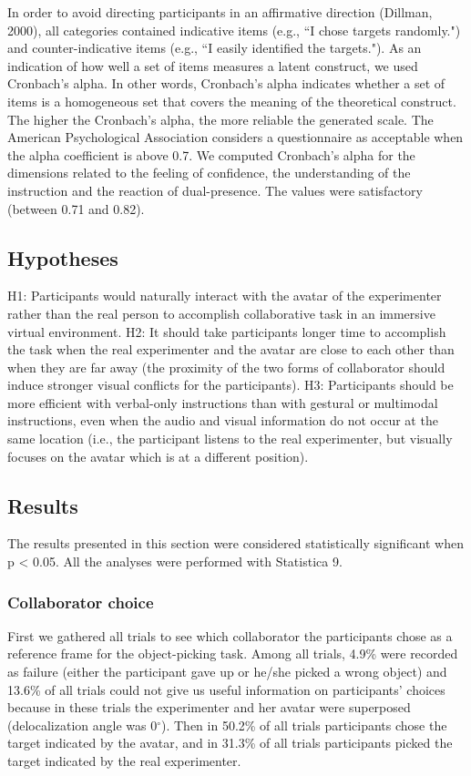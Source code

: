 In order to avoid directing participants in an affirmative direction (Dillman, 2000), all categories contained indicative items (e.g., ``I chose targets randomly.") and counter-indicative items (e.g., ``I easily identified the targets."). As an indication of how well a set of items measures a latent construct, we used Cronbach's alpha. In other words, Cronbach's alpha indicates whether a set of items is a homogeneous set that covers the meaning of the theoretical construct. The higher the Cronbach's alpha, the more reliable the generated scale. The American Psychological Association considers a questionnaire as acceptable when the alpha coefficient is above 0.7. We computed Cronbach's alpha for the dimensions related to the feeling of confidence, the understanding of the instruction and the reaction of dual-presence. The values were satisfactory (between 0.71 and 0.82).

\subsection{Hypotheses}
H1: Participants would naturally interact with the avatar of the experimenter rather than the real person to accomplish collaborative task in an immersive virtual environment.
H2: It should take participants longer time to accomplish the task when the real experimenter and the avatar are close to each other than when they are far away (the proximity of the two forms of collaborator should induce stronger visual conflicts for the participants).
H3: Participants should be more efficient with verbal-only instructions than with gestural or multimodal instructions, even when the audio and visual information do not occur at the same location (i.e., the participant listens to the real experimenter, but visually focuses on the avatar which is at a different position).

\subsection{Results}
The results presented in this section were considered statistically significant when p \textless{} 0.05. All the analyses were performed with Statistica 9.

\subsubsection{Collaborator choice}
First we gathered all trials to see which collaborator the participants chose as a reference frame for the object-picking task. Among all trials, 4.9\% were recorded as failure (either the participant gave up or he/she picked a wrong object) and 13.6\% of all trials could not give us useful information on participants' choices because in these trials the experimenter and her avatar were superposed (delocalization angle was 0$^\circ$). Then in 50.2\% of all trials participants chose the target indicated by the avatar, and in 31.3\% of all trials participants picked the target indicated by the real experimenter.

